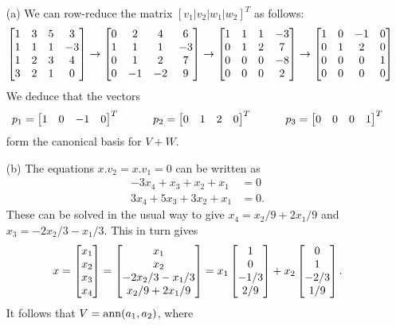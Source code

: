\documentclass[a4paper]{amsart}
\renewenvironment{solution}{\SolutionInline}{\endSolutionInline}
\begin{document}
\begin{solution}
 \begin{itemize}
  \item[(a)] We can row-reduce the matrix $[v_1|v_2|w_1|w_2]^T$ as
   follows: 
   \[ 
    \left[\begin{matrix} 
     1 & 3 & 5 &  3 \\
     1 & 1 & 1 & -3 \\
     1 & 2 & 3 &  4 \\
     3 & 2 & 1 &  0
    \end{matrix}\right]
    \to
    \left[\begin{matrix} 
     0 & 2 & 4 &  6 \\
     1 & 1 & 1 & -3 \\
     0 & 1 & 2 &  7 \\
     0 &-1 &-2 &  9
    \end{matrix}\right]
    \to
    \left[\begin{matrix} 
     1 & 1 & 1 & -3 \\
     0 & 1 & 2 &  7 \\
     0 & 0 & 0 & -8 \\
     0 & 0 & 0 &  2
    \end{matrix}\right]
    \to
    \left[\begin{matrix} 
     1 & 0 &-1 &  0 \\
     0 & 1 & 2 &  0 \\
     0 & 0 & 0 &  1 \\
     0 & 0 & 0 &  0
    \end{matrix}\right]
   \]
   We deduce that the vectors
   \[ 
    p_1 = \left[\begin{matrix} 1&0&-1&0\end{matrix}\right]^T \hspace{3em}
    p_2 = \left[\begin{matrix} 0&1&2&0\end{matrix}\right]^T \hspace{3em}
    p_3 = \left[\begin{matrix} 0&0&0&1\end{matrix}\right]^T
   \]
   form the canonical basis for $V+W$.
  \item[(b)] The equations $x.v_2=x.v_1=0$ can be written as
   \begin{align*}
    -3x_4+x_3+x_2+x_1 &= 0 \\
    3x_4+5x_3+3x_2+x_1 &= 0.
   \end{align*}
   These can be solved in the usual way to give 
   $x_4=x_2/9+2x_1/9$ and $x_3=-2x_2/3-x_1/3$.  This in turn gives
   \[ x = \left[\begin{matrix} x_1\\x_2\\x_3\\x_4 \end{matrix}\right] 
      = \left[\begin{matrix} x_1\\x_2\\-2x_2/3-x_1/3 \\ x_2/9+2x_1/9 \end{matrix}\right]
      = x_1 \left[\begin{matrix} 1 \\ 0 \\ -1/3 \\ 2/9 \end{matrix}\right] + 
        x_2 \left[\begin{matrix} 0 \\ 1 \\ -2/3 \\ 1/9 \end{matrix}\right].
   \]
   It follows that $V=\operatorname{ann}(a_1,a_2)$, where 

\end{itemize}
\end{solution}
\end{document}

